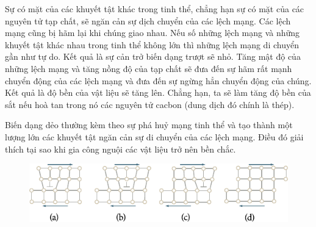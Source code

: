 
Sự có mặt của các khuyết tật khác trong tinh thể, chẳng hạn sự có mặt của các nguyên tử tạp chất, sẽ ngăn cản sự dịch chuyển của các lệch mạng. Các lệch mạng cũng bị hãm lại khi chúng giao nhau. Nếu số những lệch mạng và những khuyết tật khác nhau trong tinh thể không lớn thì những lệch mạng di chuyển gần như tự do. Kết quả là sự cản trở biến dạng trượt sẽ nhỏ. Tăng mật độ của những lệch mạng và tăng nồng độ của tạp chất sẽ đưa đến sự hãm rất mạnh chuyển động của các lệch mạng và đưa đến sự ngừng hẳn chuyển động của chúng. Kết quả là độ bền của vật liệu sẽ tăng lên. Chẳng hạn, ta sẽ làm tăng độ bền của sắt nếu hoà tan trong nó các nguyên tử cacbon (dung dịch đó chính là thép). 


Biến dạng dẻo thường kèm theo sự phá huỷ mạng tinh thể và tạo thành một lượng lớn các khuyết tật ngăn cản sự di chuyển của các lệch mạng. Điều đó giải thích tại sao khi gia công nguội các vật liệu trở nên bền chắc.

\begin{figure}[!htb]
	\begin{center}
		\includegraphics[scale=1.0]{figures/ch_13/fig_13_10.pdf}
		\caption[]{}
		\label{fig:13_10}
	\end{center}
	\vspace{-0.8cm}
\end{figure}

